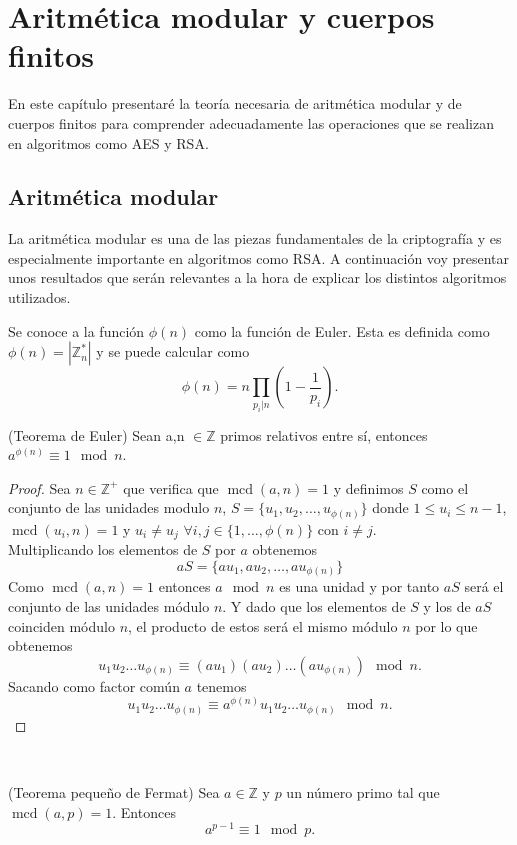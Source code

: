 \chapter{Aritmética modular y cuerpos finitos}
En este capítulo presentaré la teoría necesaria de aritmética modular y de cuerpos finitos para comprender adecuadamente las operaciones que se realizan en algoritmos como AES y RSA.

\section{Aritmética modular}
La aritmética modular es una de las piezas fundamentales de la criptografía y es especialmente importante en algoritmos como RSA. A continuación voy presentar unos resultados  que serán relevantes a la hora de explicar los distintos algoritmos utilizados.
\begin{definicion}
Se conoce a la función $\phi(n)$ como la función de Euler. Esta es definida como $\phi(n)=|\mathbb{Z}^*_n|$ y se puede calcular como $$\phi(n)=n\prod_{p_i|n}\left(1-\frac{1}{p_i}\right).$$
\end{definicion}
\begin{teorema}
	(Teorema de Euler) Sean a,n $\in \mathbb{Z}$ primos relativos entre sí, entonces $a^{\phi(n)}\equiv 1 \mod n$.
\end{teorema}\vspace*{-7mm}
\begin{proof}
		Sea $n\in \mathbb{Z^+}$ que verifica que $\operatorname{mcd}(a,n)=1$ y definimos $S$ como el conjunto de las unidades modulo $n$, $S=\{u_1,u_2,\dots,u_{\phi(n)}\}$ donde $1\leq u_i\leq n-1$, $\operatorname{mcd}(u_i,n)=1$ y $u_i\neq u_j$ $\forall i,j \in \{1,\dots,\phi(n)\}$ con $ i\neq j$.\\
	Multiplicando  los elementos de $S$ por $a$ obtenemos 
	$$
		aS=\{au_1,au_2,\dots,au_{\phi(n)}\}
	$$
	Como $\operatorname{mcd}(a,n)=1$ entonces $a\mod n$ es una unidad y por tanto $aS$ será el conjunto de las unidades módulo $n$. Y dado que los elementos de $S$ y los de $aS$ coinciden módulo $n$, el producto de estos será el mismo módulo $n$ por lo que obtenemos 
	$$
		u_1u_2\dots u_{\phi(n)} \equiv (au_1)(au_2)\dots (au_{\phi(n)})\mod n.
	$$
	Sacando como factor común $a$ tenemos 
	$$
		u_1u_2\dots u_{\phi(n)} \equiv a^{\phi(n)}u_1u_2\dots u_{\phi(n)}\mod n. 
	$$
\end{proof}\\

\begin{teorema}
		(Teorema pequeño de Fermat) Sea $a \in \mathbb{Z}$ y $p$ un número primo tal que $\operatorname{mcd}(a,p)=1$. Entonces
	$$
		a^{p-1} \equiv 1 \mod p.
	$$
\end{teorema}

